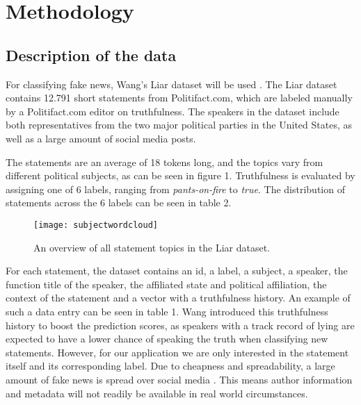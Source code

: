 \section{Methodology}

\subsection{Description of the data}
For classifying fake news, Wang's Liar dataset will be used \cite{wang2018}. 
The Liar dataset contains 12.791 short statements from Politifact.com, which are labeled manually by a Politifact.com editor on truthfulness.
The speakers in the dataset include both representatives from the two major political parties in the United States, as well as a large amount of social media posts. 

The statements are an average of 18 tokens long, and the topics vary from different political subjects, as can be seen in figure 1.
Truthfulness is evaluated by assigning one of 6 labels, ranging from \textit{pants-on-fire} to \textit{true}. 
The distribution of statements across the 6 labels can be seen in table 2.

\begin{figure}[h]
    \centering
    \texttt{[image: subjectwordcloud]}
    \caption{An overview of all statement topics in the Liar dataset.}
\end{figure}

For each statement, the dataset contains an id, a label, a subject, a speaker, the function title of the speaker, the affiliated state and political affiliation, the context of the statement and a vector with a truthfulness history.
An example of such a data entry can be seen in table 1.
Wang introduced this truthfulness history to boost the prediction scores, as speakers with a track record of lying are expected to have a lower chance of speaking the truth when classifying new statements.
However, for our application we are only interested in the statement itself and its corresponding label. 
Due to cheapness and spreadability, a large amount of fake news is spread over social media \cite{shu2017}. 
This means author information and metadata will not readily be available in real world circumstances.

